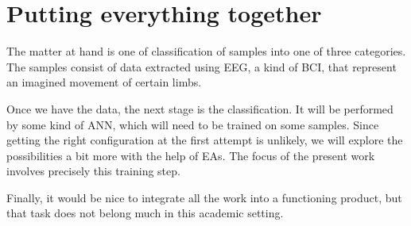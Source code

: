 \section{Putting everything together}

	The matter at hand is one of classification of samples into one of three categories. The samples consist of data extracted using \acs{EEG}, a kind of \acs{BCI}, that represent an imagined movement of certain limbs.

	Once we have the data, the next stage is the classification. It will be performed by some kind of \acs{ANN}, which will need to be trained on some samples. Since getting the right configuration at the first attempt is unlikely, we will explore the possibilities a bit more with the help of \acs{EA}s. The focus of the present work involves precisely this training step.

	Finally, it would be nice to integrate all the work into a functioning product, but that task does not belong much in this academic setting.